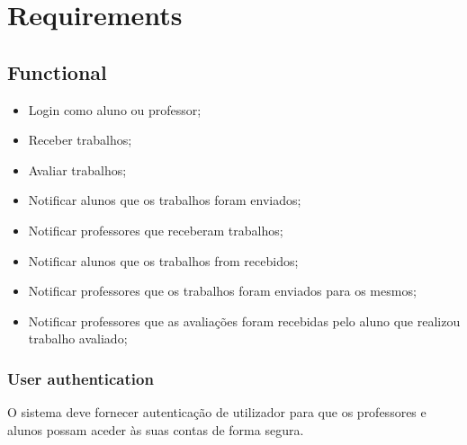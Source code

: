 \documentclass[10pt]{article}
\begin{document}
\newpage

\section{Requirements}

\subsection{Functional}
\begin{itemize}
    \item Login como aluno ou professor;
    \item Receber trabalhos;
    \item Avaliar trabalhos;
    \item Notificar alunos que os trabalhos foram enviados;
    \item Notificar professores que receberam trabalhos;
    \item Notificar alunos que os trabalhos from recebidos;
    \item Notificar professores que os trabalhos foram enviados 
        para os mesmos;
    \item Notificar professores que as avaliações foram recebidas
        pelo aluno que realizou trabalho avaliado;
\end{itemize}

\newpage

\subsubsection{User authentication}
O sistema deve fornecer autenticação de utilizador para que os 
professores e alunos possam aceder às suas contas de forma segura. 
\end{document}
